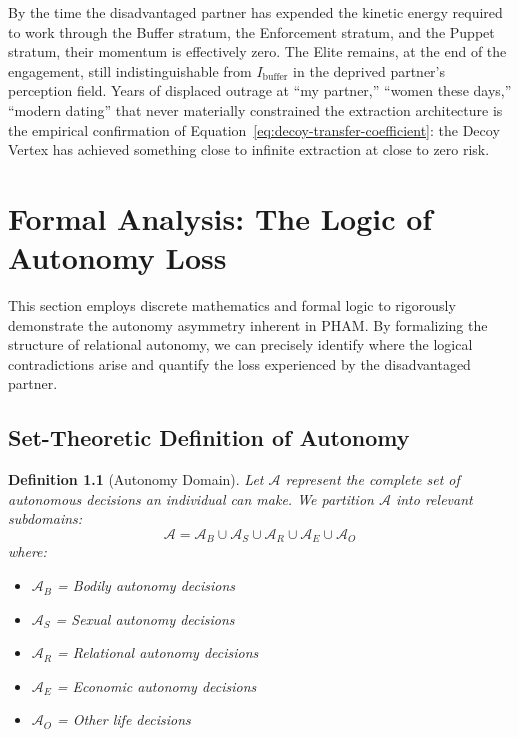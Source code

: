 \documentclass[12pt,openany]{book}
\newtheorem{definition}{Definition}[chapter]
\numberwithin{equation}{chapter}
\begin{document}
By the time the disadvantaged partner has expended the kinetic energy required to work through the Buffer stratum, the Enforcement stratum, and the Puppet stratum, their momentum is effectively zero. The Elite remains, at the end of the engagement, still indistinguishable from $I_{\text{buffer}}$ in the deprived partner's perception field. Years of displaced outrage at ``my partner,'' ``women these days,'' ``modern dating'' that never materially constrained the extraction architecture is the empirical confirmation of Equation~\eqref{eq:decoy-transfer-coefficient}: the Decoy Vertex has achieved something close to infinite extraction at close to zero risk.

\chapter{Formal Analysis: The Logic of Autonomy Loss}
\label{ch:formal_analysis}

This section employs discrete mathematics and formal logic to rigorously demonstrate the autonomy asymmetry inherent in PHAM. By formalizing the structure of relational autonomy, we can precisely identify where the logical contradictions arise and quantify the loss experienced by the disadvantaged partner.

\section{Set-Theoretic Definition of Autonomy}

\begin{definition}[Autonomy Domain]
Let $\mathcal{A}$ represent the complete set of autonomous decisions an individual can make. We partition $\mathcal{A}$ into relevant subdomains:
\[
\mathcal{A} = \mathcal{A}_B \cup \mathcal{A}_S \cup \mathcal{A}_R \cup \mathcal{A}_E \cup \mathcal{A}_O
\]
where:
\begin{itemize}
    \item $\mathcal{A}_B$ = Bodily autonomy decisions
    \item $\mathcal{A}_S$ = Sexual autonomy decisions
    \item $\mathcal{A}_R$ = Relational autonomy decisions
    \item $\mathcal{A}_E$ = Economic autonomy decisions
    \item $\mathcal{A}_O$ = Other life decisions
\end{itemize}
\end{definition}
\end{document}
